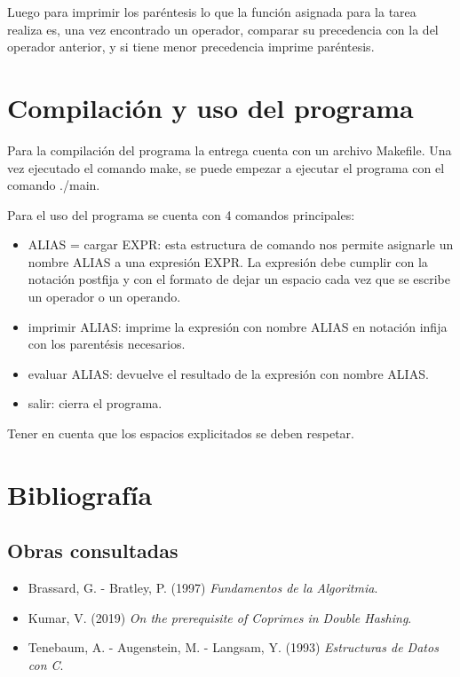 \documentclass[11pt]{article}
\begin{document}
Luego para imprimir los par\'entesis lo que la funci\'on asignada para la tarea realiza es, una vez encontrado un operador, comparar su precedencia con la del operador anterior, y si tiene menor precedencia imprime par\'entesis.  

\section{Compilaci\'on y uso del programa}

Para la compilaci\'on del programa la entrega cuenta con un archivo Makefile. Una vez ejecutado el comando make, se puede empezar a ejecutar el programa con el comando ./main. 

Para el uso del programa se cuenta con 4 comandos principales: 

\begin{itemize}
    \item ALIAS = cargar EXPR: esta estructura de comando nos permite asignarle un nombre ALIAS a una expresi\'on EXPR. La expresi\'on debe cumplir con la notaci\'on postfija y con el formato de dejar un espacio cada vez que se escribe un operador o un operando. 
    \item imprimir ALIAS: imprime la expresi\'on con nombre ALIAS en notaci\'on infija con los parent\'esis necesarios. 
    \item evaluar ALIAS: devuelve el resultado de la expresi\'on con nombre ALIAS. 
    \item salir: cierra el programa. 
\end{itemize}

Tener en cuenta que los espacios explicitados se deben respetar. 

\section{Bibliograf\'ia}

\subsection{Obras consultadas}
\begin{itemize}
    \item Brassard, G. - Bratley, P. (1997) \emph{Fundamentos de la Algoritmia}.
    \item Kumar, V. (2019) \emph{On the prerequisite of Coprimes in Double Hashing}.
    \item Tenebaum, A. - Augenstein, M. - Langsam, Y. (1993) \emph{Estructuras de Datos con C}.
\end{itemize}
\end{document}

